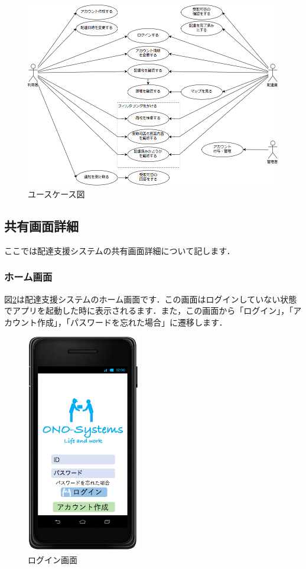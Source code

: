 \documentclass[a4j,titlepage]{jarticle}
\begin{document}
\begin{figure}[H]
 \begin{center}
  \includegraphics[width=150mm]{use_case.png}
	\caption{ユースケース図}
	\label{fig:use_case}
 \end{center}

\end{figure}

\newpage
\subsection{共有画面詳細}
ここでは配達支援システムの共有画面詳細について記します．

\subsubsection{ホーム画面}
図\ref{fig:login}は配達支援システムのホーム画面です．この画面はログインしていない状態でアプリを起動した時に表示されるます．また，この画面から「ログイン」，「アカウント作成」，「パスワードを忘れた場合」に遷移します．

\begin{figure}[H]
 \begin{center}
  \includegraphics[width=50mm]{login.png}
	\caption{ログイン画面}
	\label{fig:login}
 \end{center}

\end{figure}
\end{document}
